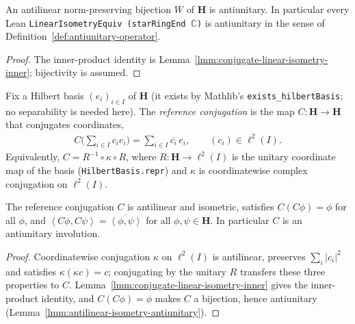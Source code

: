 \begin{lemma}
    \label{lmm:antilinear-isometry-antiunitary}
    \leanok
    An antilinear norm-preserving bijection $W$ of $\mathbf{H}$ is antiunitary. In particular every Lean \texttt{LinearIsometryEquiv (starRingEnd \ensuremath{\mathbb{C}})} is antiunitary in the sense of Definition~\ref{def:antiunitary-operator}.
\end{lemma}
\begin{proof}
    \leanok
    The inner-product identity is Lemma~\ref{lmm:conjugate-linear-isometry-inner}; bijectivity is assumed.
\end{proof}

\begin{definition}
    \label{def:reference-conjugation}
    \leanok
    Fix a Hilbert basis $(e_i)_{i \in I}$ of $\mathbf{H}$ (it exists by Mathlib's \texttt{exists\_hilbertBasis}; no separability is needed here). The \emph{reference conjugation} is the map $C : \mathbf{H} \to \mathbf{H}$ that conjugates coordinates,
    \begin{align}
        C\Big( \sum_{i \in I} c_i e_i \Big) = \sum_{i \in I} \overline{c_i}\, e_i, \qquad (c_i) \in \ell^2(I).
    \end{align}
    Equivalently, $C = R^{-1} \circ \kappa \circ R$, where $R : \mathbf{H} \to \ell^2(I)$ is the unitary coordinate map of the basis (\texttt{HilbertBasis.repr}) and $\kappa$ is coordinatewise complex conjugation on $\ell^2(I)$.
\end{definition}

\begin{lemma}
    \label{lmm:reference-conjugation-properties}
    \leanok
    The reference conjugation $C$ is antilinear and isometric, satisfies $C(C\phi) = \phi$ for all $\phi$, and $\left< C\phi, C\psi \right> = \overline{\left< \phi, \psi \right>}$ for all $\phi, \psi \in \mathbf{H}$. In particular $C$ is an antiunitary involution.
\end{lemma}
\begin{proof}
    \leanok
    Coordinatewise conjugation $\kappa$ on $\ell^2(I)$ is antilinear, preserves $\sum_i |c_i|^2$ and satisfies $\kappa(\kappa c) = c$; conjugating by the unitary $R$ transfers these three properties to $C$. Lemma~\ref{lmm:conjugate-linear-isometry-inner} gives the inner-product identity, and $C(C\phi) = \phi$ makes $C$ a bijection, hence antiunitary (Lemma~\ref{lmm:antilinear-isometry-antiunitary}).
\end{proof}

